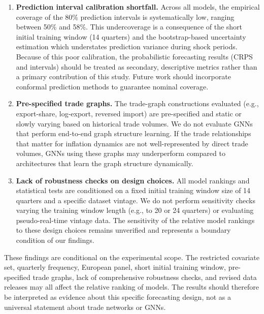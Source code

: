 \documentclass[
]{article}
\begin{document}
\begin{enumerate}
  associations. The study does not establish causal mechanisms for
  inflation transmission, nor does it imply that monitoring
  trade-network topology would improve central bank forecasting
  decisions without further validation.
\item
  \textbf{Prediction interval calibration shortfall.} Across all models, the empirical coverage of the 80\% prediction intervals is systematically low, ranging between 50\% and 58\%. This undercoverage is a consequence of the short initial training window (14 quarters) and the bootstrap-based uncertainty estimation which understates prediction variance during shock periods. Because of this poor calibration, the probabilistic forecasting results (CRPS and intervals) should be treated as secondary, descriptive metrics rather than a primary contribution of this study. Future work should incorporate conformal prediction methods to guarantee nominal coverage.
\item
  \textbf{Pre-specified trade graphs.} The trade-graph constructions evaluated (e.g., export-share, log-export, reversed import) are pre-specified and static or slowly varying based on historical trade volumes. We do not evaluate GNNs that perform end-to-end graph structure learning. If the trade relationships that matter for inflation dynamics are not well-represented by direct trade volumes, GNNs using these graphs may underperform compared to architectures that learn the graph structure dynamically.
\item
  \textbf{Lack of robustness checks on design choices.} All model rankings and statistical tests are conditioned on a fixed initial training window size of 14 quarters and a specific dataset vintage. We do not perform sensitivity checks varying the training window length (e.g., to 20 or 24 quarters) or evaluating pseudo-real-time vintage data. The sensitivity of the relative model rankings to these design choices remains unverified and represents a boundary condition of our findings.
\end{enumerate}

These findings are conditional on the experimental scope. The restricted covariate set, quarterly frequency, European panel, short initial training window, pre-specified trade graphs, lack of comprehensive robustness checks, and revised data releases may all affect the relative ranking of models. The results should therefore be interpreted as evidence about this specific forecasting design, not as a universal statement about trade networks or GNNs.
\end{document}
